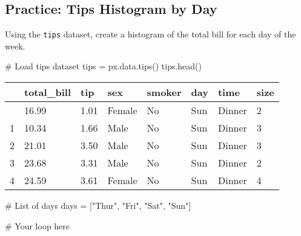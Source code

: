 \documentclass[
  letterpaper,
  DIV=11,
  numbers=noendperiod]{scrreprt}
\newenvironment{Shaded}{\begin{snugshade}}{\end{snugshade}}
\newcommand{\CommentTok}[1]{\textcolor[rgb]{0.37,0.37,0.37}{#1}}
\newcommand{\NormalTok}[1]{\textcolor[rgb]{0.00,0.23,0.31}{#1}}
\newcommand{\OperatorTok}[1]{\textcolor[rgb]{0.37,0.37,0.37}{#1}}
\newcommand{\StringTok}[1]{\textcolor[rgb]{0.13,0.47,0.30}{#1}}
\begin{document}
\begin{tcolorbox}[enhanced jigsaw, colframe=quarto-callout-tip-color-frame, opacityback=0, titlerule=0mm, bottomrule=.15mm, breakable, leftrule=.75mm, colbacktitle=quarto-callout-tip-color!10!white, title=\textcolor{quarto-callout-tip-color}{\faLightbulb}\hspace{0.5em}{Practice}, rightrule=.15mm, coltitle=black, opacitybacktitle=0.6, colback=white, left=2mm, arc=.35mm, toptitle=1mm, bottomtitle=1mm, toprule=.15mm]

\subsection{Practice: Tips Histogram by
Day}\label{practice-tips-histogram-by-day}

Using the \texttt{tips} dataset, create a histogram of the total bill
for each day of the week.

\begin{Shaded}
\begin{Highlighting}[]
\CommentTok{\# Load tips dataset}
\NormalTok{tips }\OperatorTok{=}\NormalTok{ px.data.tips()}
\NormalTok{tips.head()}
\end{Highlighting}
\end{Shaded}

\begin{longtable}[]{@{}llllllll@{}}
\toprule\noalign{}
& total\_bill & tip & sex & smoker & day & time & size \\
\midrule\noalign{}
\endhead
\bottomrule\noalign{}
\endlastfoot
0 & 16.99 & 1.01 & Female & No & Sun & Dinner & 2 \\
1 & 10.34 & 1.66 & Male & No & Sun & Dinner & 3 \\
2 & 21.01 & 3.50 & Male & No & Sun & Dinner & 3 \\
3 & 23.68 & 3.31 & Male & No & Sun & Dinner & 2 \\
4 & 24.59 & 3.61 & Female & No & Sun & Dinner & 4 \\
\end{longtable}

\begin{Shaded}
\begin{Highlighting}[]
\CommentTok{\# List of days}
\NormalTok{days }\OperatorTok{=}\NormalTok{ [}\StringTok{"Thur"}\NormalTok{, }\StringTok{"Fri"}\NormalTok{, }\StringTok{"Sat"}\NormalTok{, }\StringTok{"Sun"}\NormalTok{]}

\CommentTok{\# Your loop here}
\end{Highlighting}
\end{Shaded}

\end{tcolorbox}
\end{document}
